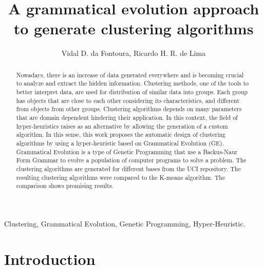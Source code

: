 \documentclass[journal]{IEEEtran}
\begin{document}
	
	\title{A grammatical evolution approach to generate clustering algorithms}
	
	
	\author{
		Vidal D. da Fontoura,
		Ricardo H. R. de Lima
	}
	
	
	\maketitle
	
	\begin{abstract}
		Nowadays, there is an increase of data generated everywhere and is becoming crucial to analyze and extract the hidden information. Clustering methods, one of the tools to better interpret data, are used for distribution of similar data into groups. Each group has objects that are close to each other considering its characteristics, and different from objects from other groups. Clustering algorithms depends on many parameters that are domain dependent hindering their application. In this context, the field of hyper-heuristics raises as an alternative by allowing the generation of a custom algorithm. In this sense, this work proposes the automatic design of clustering algorithms by using a hyper-heuristic based on Grammatical Evolution (GE). Grammatical Evolution is a type of Genetic Programming that use a Backus-Naur Form Grammar to evolve a population of computer programs to solve a problem. The clustering algorithms are generated for different bases from the UCI repository. The resulting clustering algorithms were compared to the K-means algorithm. The comparison shows promising results. 
		
		
	\end{abstract}
	
	\begin{IEEEkeywords}
		Clustering, Grammatical Evolution, Genetic Programming, Hyper-Heuristic.
	\end{IEEEkeywords}
	
	\IEEEpeerreviewmaketitle
	
	
	\section{Introduction}
	
\end{document}
